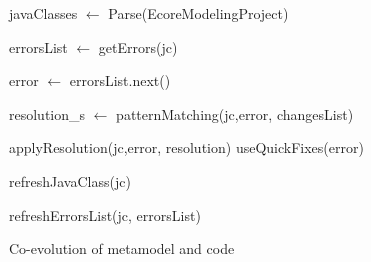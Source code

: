 	
	\begin{algorithm2e}[t]
		\small
		\SetAlgoLined
		javaClasses $\leftarrow$ Parse(EcoreModelingProject)
		
		{
			errorsList $\leftarrow $ getErrors(jc)
			
			{
				error  $\leftarrow$ errorsList.next()
				
				resolution\_s $\leftarrow$ patternMatching(jc,error, changesList)
				
				{
					{
						applyResolution(jc,error, resolution)
					}
				}
				{
					useQuickFixes(error) %
				}
				
				refreshJavaClass(jc) 
				
				refreshErrorsList(jc, errorsList)
			}
			
		}
		
		\caption{Co-evolution of metamodel and code}
		\label{algo :overallalgo}
	\end{algorithm2e}
	
